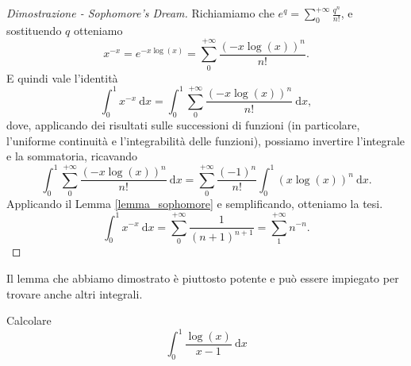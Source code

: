 \begin{proof}[Dimostrazione - Sophomore's Dream]
	Richiamiamo che $e^q= \sum^{+ \infty}_0 \frac{q^n}{n!}$, e sostituendo $q$ otteniamo
	\begin{equation*}
		x^{-x}=e^{-x \log(x)}= 
		\sum^{+ \infty}_0 \frac{(-x \log(x))^n}{n!}.
	\end{equation*}
	E quindi vale l'identità
	\begin{equation*}
		\int^1_0x^{-x} \: \mathrm{d}x= 
		\int^1_0 \sum^{+ \infty}_0 \frac{(-x \log(x))^n}{n!} \: \mathrm{d}x,
	\end{equation*}
	dove, applicando dei risultati sulle successioni di funzioni (in particolare, l'uniforme continuità e l'integrabilità delle funzioni), possiamo invertire l'integrale e la sommatoria, ricavando
	\begin{equation*}
		\int^1_0 \sum^{+ \infty}_0 \frac{(-x \log(x))^n}{n!} \: \mathrm{d}x= 
		\sum^{+ \infty}_0 \frac{(-1)^n}{n!} \int^1_0(x \log(x))^n \: \mathrm{d}x.
	\end{equation*}
	Applicando il Lemma \ref{lemma_sophomore} e semplificando, otteniamo la tesi.
	\begin{equation*}
		\int^1_0x^{-x} \: \mathrm{d}x= 
		\sum^{+ \infty}_0 \frac{1}{(n+1)^{n+1}}= 
		\sum^{+ \infty}_1n^{-n}.
	\end{equation*}
\end{proof}
Il lemma che abbiamo dimostrato è piuttosto potente e può essere impiegato per trovare anche altri integrali.
\begin{Res} 
	Calcolare
	\begin{equation*}
		\int^1_0 \frac{ \log(x)}{x-1} \: \mathrm{d}x
	\end{equation*}
\end{Res}
